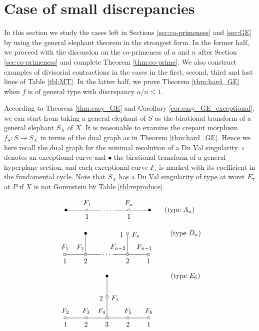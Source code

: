 \documentclass[a4paper,11pt]{amsart}
\theoremstyle{definition}
\theoremstyle{remark}
\numberwithin{equation}{section}
\begin{document}
\section{Case of small discrepancies}\label{sec:small}
In this section we study the cases left in Sections
\ref{sec:co-primeness} and \ref{sec:GE}
by using the general elephant theorem in the strongest form.
In the former half,
we proceed with the discussion on the co-primeness of $a$ and $n$
after Section \ref{sec:co-primeness}
and complete Theorem \ref{thm:co-prime}.
We also construct examples of divisorial contractions
in the cases in the first, second, third and last lines of Table \ref{tbl:MT}.
In the latter half,
we prove Theorem \ref{thm:hard_GE}
when $f$ is of general type with discrepancy $a/n \le 1$.

According to Theorem \ref{thm:easy_GE} and
Corollary \ref{cor:easy_GE_exceptional},
we can start from taking a general elephant of $S$
as the birational transform of a general elephant $S_X$ of $X$.
It is reasonable to examine the crepant morphism $f_S \colon S \to S_X$
in terms of the dual graph as in Theorem \ref{thm:hard_GE}.
Hence we here recall the dual graph for
the minimal resolution of a Du Val singularity.
$\circ$ denotes an exceptional curve and
$\bullet$ the birational transform of a general hyperplane section,
and each exceptional curve $F_i$ is marked with
its coefficient in the fundamental cycle.
Note that $S_X$ has a Du Val singularity of type at worst $E_7$ at $P$
if $X$ is not Gorenstein by Table \ref{tbl:reproduce}.
\begin{align}
\xymatrix@!0@=30pt{
*=<3.5pt>{\bullet} \ar@{-}[r] &
*=<3.5pt>{\circ} \ar@{-}[r]^<*+{\>\!\!\!F_1}_<*+{\>\!\!\!1} &
\cdots \ar@{-}[r] & 
*=<3.5pt>{\circ} \ar@{-}[r]^<*+{\>\!\!\!F_n}_<*+{\>\!\!\!1} &
*=<3.5pt>{\bullet}
}\tag{type $A_n$}
\end{align}
\begin{align}
\xymatrix@!0@=30pt{
&
*=<3.5pt>{\bullet} \ar@{-}[d] &
&
*=<3.5pt>{\circ} \ar@{-}[d]^<*+{F_n}_<*+{1} &
\\
*=<3.5pt>{\circ}
\ar@{-}[r]^<*+{\>\!\!\!F_1}_<*+{\>\!\!\!1}^>>>*+{F_2}_>*+{\ 2} &
*=<3.5pt>{\circ} \ar@{-}[r] &
\cdots \ar@{-}[r]^>>>>>*+{F_{n-2}}_>*+{\ 2} & 
*=<3.5pt>{\circ} \ar@{-}[r]^>>>*+{\ F_{n-1}}_>*+{\ 1} &
*=<3.5pt>{\circ}
}\tag{type $D_n$}
\end{align}
\begin{align}
\xymatrix@!0@=30pt{
&
&
*=<3.5pt>{\bullet} \ar@{-}[d] &
&
\\
&
&
*=<3.5pt>{\circ} \ar@{-}[d]^<*+{F_1}_<*+{2} &
&
\\
*=<3.5pt>{\circ}
\ar@{-}[r]^<*+{\>\!\!\!F_2}_<*+{\>\!\!\!1}^>*+{\ F_3}_>*+{\ 2} &
*=<3.5pt>{\circ} \ar@{-}[r]^>>>*+{F_4}_>*+{\ 3} &
*=<3.5pt>{\circ} \ar@{-}[r]^>*+{\ F_5}_>*+{\ 2} & 
*=<3.5pt>{\circ} \ar@{-}[r]^>*+{\ F_6}_>*+{\ 1} &
*=<3.5pt>{\circ}
}\tag{type $E_6$}
\end{align}
\end{document}
